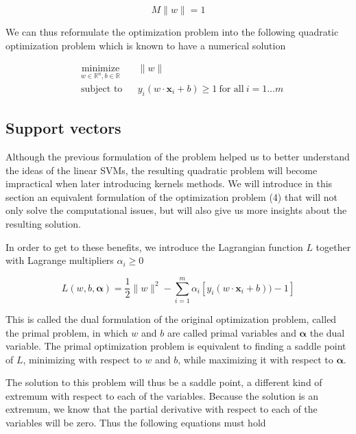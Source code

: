 \begin{equation*}
  M\|w\| = 1
\end{equation*}
  
We can thus reformulate the optimization problem into the following quadratic optimization problem which is known to have a numerical solution

\begin{equation}
  \begin{aligned}
    &\underset{w \in \mathbb{R}^n, b \in \mathbb{R}} {\text{minimize}}
    & &\|w\|\\
    &\text{subject to}
    & &y_i(w \cdot \mathbf{x}_i + b) \ge 1\ \text{for all}\ i = 1 \dotsc m
  \end{aligned}
\end{equation}

\subsection {Support vectors}

Although the previous formulation of the problem helped us to better understand the ideas of the linear SVMs, the resulting quadratic problem will become impractical when later introducing kernels methods. We will introduce in this section an equivalent formulation of the optimization problem (4) that will not only solve the computational issues, but will also give us more insights about the resulting solution.

In order to get to these benefits, we introduce the Lagrangian function $L$ together with Lagrange multipliers $\alpha_i \ge 0$

\begin{equation}
  L(w, b, \boldsymbol{\alpha}) = \frac{1}{2}\|w\|^2 - \sum^m_{i=1} \alpha_i[y_i(w \cdot \mathbf{x}_i + b)) - 1]
\end{equation}

This is called the dual formulation of the original optimization problem, called the primal problem, in which $w$ and $b$ are called primal variables and $\boldsymbol{\alpha}$ the dual variable. The primal optimization problem is equivalent to finding a saddle point of $L$, minimizing with respect to $w$ and $b$, while maximizing it with respect to $\boldsymbol{\alpha}$.

The solution to this problem will thus be a saddle point, a different kind of extremum with respect to each of the variables. Because the solution is an extremum, we know that the partial derivative with respect to each of the variables will be zero. Thus the following equations must hold

